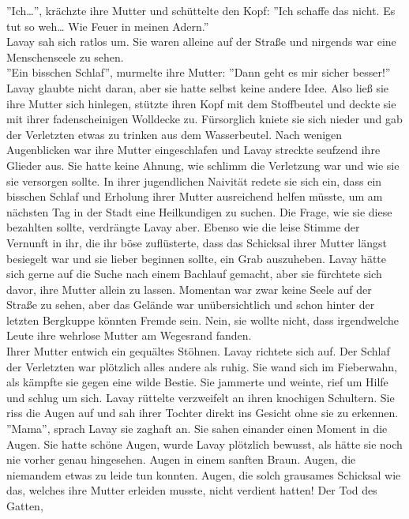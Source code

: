 ''Ich…'', krächzte ihre Mutter und schüttelte den Kopf: ''Ich schaffe das nicht. Es tut so weh… Wie 
Feuer in meinen Adern.''\\
Lavay sah sich ratlos um. Sie waren alleine auf der Straße und nirgends war eine Menschenseele zu 
sehen.\\
''Ein bisschen Schlaf'', murmelte ihre Mutter: ''Dann geht es mir sicher besser!''\\
Lavay glaubte nicht daran, aber sie hatte selbst keine andere Idee. Also ließ sie ihre Mutter sich
hinlegen, stützte ihren Kopf mit dem Stoffbeutel und deckte sie mit ihrer fadenscheinigen Wolldecke 
zu. Fürsorglich kniete sie sich nieder und gab der Verletzten etwas zu trinken aus dem 
Wasserbeutel. Nach wenigen Augenblicken war ihre Mutter eingeschlafen und Lavay streckte seufzend 
ihre Glieder aus. Sie hatte keine Ahnung, wie schlimm die Verletzung war und wie sie sie versorgen 
sollte. In ihrer jugendlichen Naivität redete sie sich ein, dass ein bisschen Schlaf und Erholung 
ihrer Mutter ausreichend helfen müsste, um am nächsten Tag in der Stadt eine Heilkundigen zu suchen. 
Die Frage, wie sie diese bezahlten sollte, verdrängte Lavay aber. Ebenso wie die leise Stimme der 
Vernunft in ihr, die ihr böse zuflüsterte, dass das Schicksal ihrer Mutter längst besiegelt war und 
sie lieber beginnen sollte, ein Grab auszuheben. Lavay hätte sich gerne auf die Suche nach einem 
Bachlauf gemacht, aber sie fürchtete sich davor, ihre Mutter allein zu lassen. Momentan war zwar 
keine Seele auf der Straße zu sehen, aber das Gelände war unübersichtlich und schon hinter der 
letzten Bergkuppe könnten Fremde sein. Nein, sie wollte nicht, dass irgendwelche Leute ihre 
wehrlose Mutter am Wegesrand fanden.\\
Ihrer Mutter entwich ein gequältes Stöhnen. Lavay richtete sich auf. Der Schlaf der Verletzten war 
plötzlich alles andere als ruhig. Sie wand sich im Fieberwahn, als kämpfte sie gegen eine wilde 
Bestie. Sie jammerte und weinte, rief um Hilfe und schlug um sich. Lavay rüttelte verzweifelt an 
ihren knochigen Schultern. Sie riss die Augen auf und sah ihrer Tochter direkt ins Gesicht ohne sie 
zu erkennen.\\
''Mama'', sprach Lavay sie zaghaft an. Sie sahen einander einen Moment in die Augen. Sie hatte 
schöne Augen, wurde Lavay plötzlich bewusst, als hätte sie noch nie vorher genau hingesehen. Augen 
in einem sanften Braun. Augen, die niemandem etwas zu leide tun konnten. Augen, die solch grausames 
Schicksal wie das, welches ihre Mutter erleiden musste, nicht verdient hatten! Der Tod des Gatten, 
